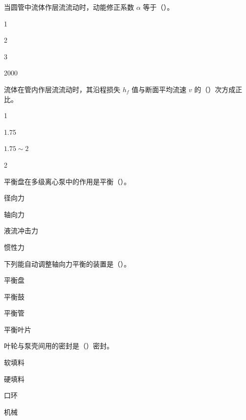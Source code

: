\begin{ti}
\item 当圆管中流体作层流流动时，动能修正系数 $\alpha$ 等于（\quad）。
\begin{choices}
\item 1
\item 2
\item 3
\item 2000
\end{choices}

\item 流体在管内作层流流动时，其沿程损失 $h_f$ 值与断面平均流速 $v$ 的（\quad）次方成正比。
\begin{choices}
\item 1
\item 1.75
\item $1.75\sim2$
\item 2
\end{choices}

\item 平衡盘在多级离心泵中的作用是平衡（\quad）。
\begin{choices}
\item 径向力
\item 轴向力
\item 液流冲击力
\item 惯性力
\end{choices}

\item 下列能自动调整轴向力平衡的装置是（\quad）。
\begin{choices}
\item 平衡盘
\item 平衡鼓
\item 平衡管
\item 平衡叶片
\end{choices}

\item 叶轮与泵壳间用的密封是（\quad）密封。
\begin{choices}
\item 软填料
\item 硬填料
\item 口环
\item 机械
\end{choices}


\end{ti}

